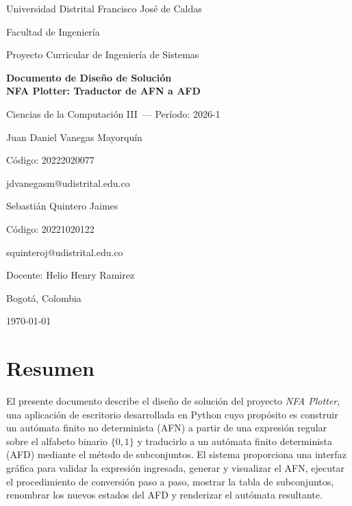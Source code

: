 \documentclass[12pt]{article}
\newcommand{\universidad}{Universidad Distrital Francisco José de Caldas}
\newcommand{\facultad}{Facultad de Ingeniería}
\newcommand{\programa}{Proyecto Curricular de Ingeniería de Sistemas}
\newcommand{\materia}{Ciencias de la Computación III}
\newcommand{\periodo}{2026-1}
\newcommand{\docente}{Helio Henry Ramirez}
\newcommand{\tituloInforme}{Documento de Diseño de Solución\\NFA Plotter: Traductor de AFN a AFD}
\begin{document}
\begin{titlepage}
    \centering

    {\large \universidad \par}
    {\large \facultad \par}
    {\large \programa \par}

    \vspace{2cm}

    {\Large \textbf{\tituloInforme}\par}

    \vspace{0.5cm}

    {\large \materia\ --- Período: \periodo \par}

    \vspace{2cm}

    {\large
    Juan Daniel Vanegas Mayorquín \par
    Código: 20222020077 \par
    jdvanegasm@udistrital.edu.co \par
    }

    \vspace{0.8cm}

    {\large
    Sebastián Quintero Jaimes \par
    Código: 20221020122 \par
    squinteroj@udistrital.edu.co \par
    }

    \vspace{2cm}

    {\large Docente: \docente \par}

    \vfill

    {\large Bogotá, Colombia \par}
    {\large \today \par}
\end{titlepage}

\section*{Resumen}

El presente documento describe el diseño de solución del proyecto \textit{NFA Plotter}, una aplicación de escritorio desarrollada en Python cuyo propósito es construir un autómata finito no determinista (AFN) a partir de una expresión regular sobre el alfabeto binario $\{0,1\}$ y traducirlo a un autómata finito determinista (AFD) mediante el método de subconjuntos. El sistema proporciona una interfaz gráfica para validar la expresión ingresada, generar y visualizar el AFN, ejecutar el procedimiento de conversión paso a paso, mostrar la tabla de subconjuntos, renombrar los nuevos estados del AFD y renderizar el autómata resultante.
\end{document}
